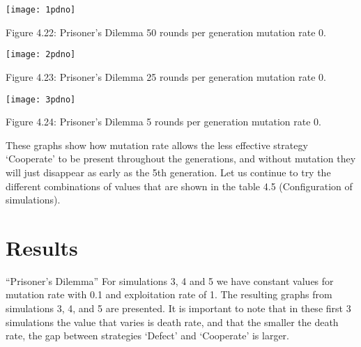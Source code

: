 \documentclass{article}
\begin{document}
\begin{center}
	\texttt{[image: 1pdno]}
	
Figure 4.22: Prisoner's Dilemma 50 rounds per generation mutation rate 0.
	
	\texttt{[image: 2pdno]}
	
Figure 4.23: Prisoner's Dilemma 25 rounds per generation mutation rate 0.

	\texttt{[image: 3pdno]}

Figure 4.24: Prisoner's Dilemma 5 rounds per generation mutation rate 0.
\end{center}
These graphs show how mutation rate allows the less effective strategy `Cooperate' to be present throughout the generations, and without mutation they will just disappear as early as the 5th generation. 
Let us continue to try the different combinations of values that are shown in the table 4.5 (Configuration of simulations). 

\newpage
\section{Results}
``Prisoner's Dilemma''
For simulations 3, 4 and 5 we have constant values for mutation rate with 0.1 and exploitation rate of 1. The resulting graphs from simulations 3, 4, and 5 are presented. It is important to note that in these first 3 simulations the value that varies is death rate, and that the smaller the death rate, the gap between strategies `Defect' and `Cooperate' is larger.
\end{document}
